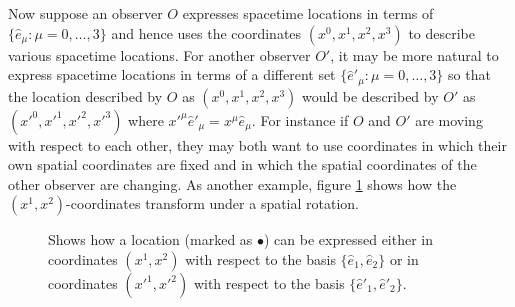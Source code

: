 Now suppose an observer $O$ expresses spacetime locations in terms of $\{\hat{e}_\mu:\mu=0,\ldots,3\}$ and hence uses the coordinates $(x^0, x^1, x^2, x^3)$ to describe various spacetime locations. For another observer $O'$, it may be more natural to express spacetime locations in terms of a different set $\{\hat{e}'_\mu:\mu=0,\ldots,3\}$ so that the location described by $O$ as $(x^0, x^1, x^2, x^3)$ would be described by $O'$ as $({x'}^0, {x'}^1, {x'}^2, {x'}^3)$ where ${x'}^\mu{\hat{e}'}_\mu=x^\mu\hat{e}_\mu$.  For instance if $O$ and $O'$ are moving with respect to each other, they may both want to use coordinates in which their own spatial coordinates are fixed and in which the spatial coordinates of the other observer are changing. As another example, figure \ref{rotfigure} shows how the $(x^1, x^2)$-coordinates transform under a spatial rotation. 


\begin{figure}[ht!]
\captionsetup{justification=justified}
\centering
{} 
\vspace*{2px}
\caption{Shows how a location (marked as $\bullet$) can be expressed either  in coordinates $(x^1, x^2)$ with respect to the basis $\{\hat{e}_1,\hat{e}_2\}$ or in coordinates $({x'}^1,{x'}^2)$ with respect to the basis $\{\hat{e}'_1,\hat{e}'_2\}$.}\label{rotfigure}
\end{figure}

